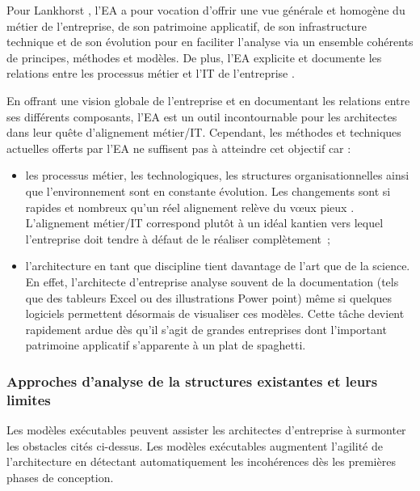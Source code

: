Pour Lankhorst \cite{lankhorst2013enterprise}, l'EA a pour vocation d'offrir une vue
générale et homogène du métier de l'entreprise, de son patrimoine applicatif,
de son infrastructure technique et de son évolution pour en faciliter
l'analyse via un ensemble cohérents de principes, méthodes et modèles. De plus, l'EA explicite et documente les relations entre les processus métier et
l'IT de l'entreprise \cite{kaisler_enterprise_2005}. 
	
En offrant une vision globale de l'entreprise et en documentant les
relations entre ses différents composants, l'EA est un outil incontournable
pour les architectes dans leur quête d'alignement métier/IT. Cependant, les
méthodes et techniques actuelles offerts par l'EA ne suffisent pas à atteindre
cet objectif \cite{barn2013enterprise} car :
\begin{itemize}
\item les processus métier, les technologiques, les structures organisationnelles
ainsi que l'environnement sont en constante évolution. Les changements sont si
rapides et nombreux qu'un réel alignement relève du vœux pieux
\cite{lankhorst2013enterprise}. L'alignement métier/IT correspond plutôt à un
idéal kantien vers lequel l'entreprise doit tendre à défaut de le réaliser
complètement~;

\item l'architecture en tant que discipline tient davantage de l'art que de la science.
En effet, l'architecte d'entreprise analyse souvent de la documentation (tels que des tableurs Excel ou des
illustrations Power point) même si quelques logiciels permettent désormais de
visualiser ces modèles. Cette tâche devient rapidement ardue dès qu'il s'agit
de grandes entreprises dont l'important patrimoine applicatif s'apparente à un
plat de spaghetti.
\end{itemize}

\subsubsection{Approches d'analyse de la structures existantes et leurs limites}
	
Les modèles exécutables peuvent assister les architectes d'entreprise à
surmonter les obstacles cités ci-dessus. Les modèles exécutables augmentent
l'agilité de l'architecture en détectant automatiquement les incohérences dès
les premières phases de conception. 
	
